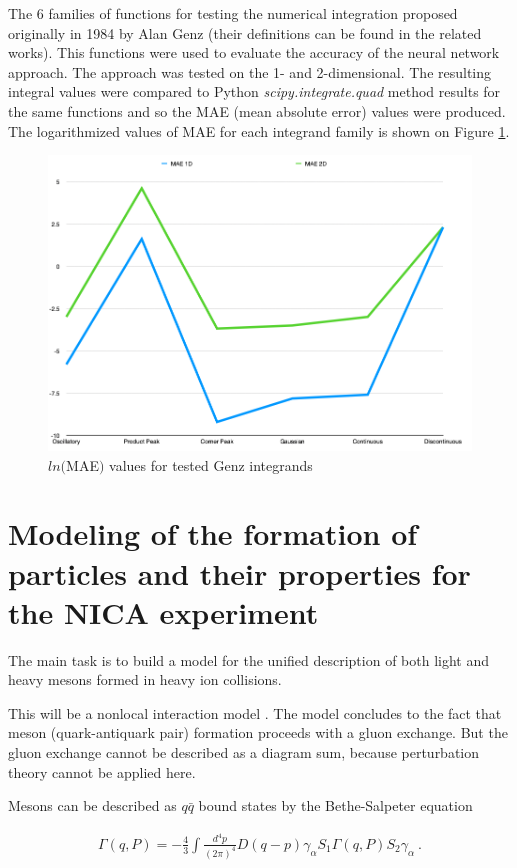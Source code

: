 \documentclass[%
]{ittmm}
\begin{document}
The 6 families of functions for testing the numerical integration proposed originally in 1984 by Alan Genz\cite{genz} (their definitions can be found in the related works). This functions were used to evaluate the accuracy of the neural network approach. The approach was tested on the 1- and 2-dimensional. The resulting integral values were compared to Python \textit{scipy.integrate.quad} method results for the same functions and so the MAE (mean absolute error) values were produced. The logarithmized values of MAE for each integrand family is shown on Figure \ref{fig:genz-rests}.

\begin{figure}[h!]
\centering
\includegraphics[width=0.75\linewidth]{maes.png}
\caption{ $ln($MAE$)$ values for tested Genz integrands}
\label{fig:genz-rests}
\end{figure}


\section{Modeling of the formation of particles and their properties for the NICA experiment}

The main task is to build a model for the unified description of both light and heavy mesons formed in heavy ion collisions.

 This will be a nonlocal interaction model \cite{schmidt, costa}. 
 The model concludes to the fact that meson (quark-antiquark pair) formation proceeds with a gluon exchange. But the gluon exchange cannot be described as a diagram sum, because perturbation theory cannot be applied here. 
 
 Mesons can be described as $q\bar{q}$ bound states by 
the Bethe-Salpeter equation

\begin{eqnarray}\label{BS}
  \Gamma (q,P) = -\frac{4}{3} \int \frac{d^4 p}{(2\pi)^4}
  D(q-p) \gamma_\alpha S_1 \Gamma (q,P)
S_2 \gamma_\alpha \  .
\end{eqnarray}
\end{document}
